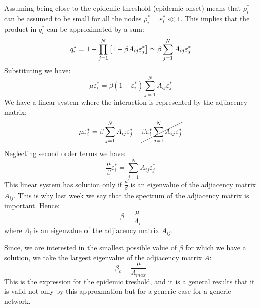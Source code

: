 \documentclass[../main/main.tex]{subfiles}
\begin{document}
Assuming being close to the epidemic threshold (epidemic onset) means that \( \rho _i^* \) can be assumed to be small for all the nodes \( \rho _i^* = \varepsilon _i^* \ll 1 \). This implies that the product in \( q_i^* \) can be approximated by a sum:
\begin{equation}
  q_i^* = 1 - \prod_{j=1}^{N} \qty[1- \beta A_{ij} \varepsilon _j^*] \simeq \beta \sum_{j=1}^{N} A_{ij} \varepsilon _j^*
\end{equation}
Substituting we have:
\begin{equation}
  \mu \varepsilon _i^* = \beta (1- \varepsilon _i^*) \sum_{j=1}^{N} A_{ij} \varepsilon _{j}^*
\end{equation}
We have a linear system where the interaction is represented by the adjiacency matrix:
\begin{equation*}
  \mu \varepsilon _i^* = \beta \sum_{j=1}^{N} A_{ij} \varepsilon _{j}^* - \cancel{ \beta \varepsilon _i^* \sum_{j=1}^{N} A_{ij} \varepsilon _{j}^* }
\end{equation*}
Neglecting second order terms we have:
\begin{equation}
  \frac{\mu }{\beta } \varepsilon _i^* = \sum_{j=1}^{N} A_{ij} \varepsilon _j^*
\end{equation}
This linear system has solution only if \( \frac{\mu }{\beta } \) is an eigenvalue of the adjiacency matrix \( A_{ij} \). This is why last week we say that the spectrum of the adjiacency matrix is important.
Hence:
\begin{equation}
  \beta = \frac{\mu }{\Lambda _i}
\end{equation}
where \( \Lambda _i \) is an eigenvalue of the adjiacency matrix \( A_{ij} \).

Since, we are interested in the smallest possible value of \( \beta  \) for which we have a solution, we take the largest eigenvalue of the adjiacency matrix \( A \):
\begin{equation}
  \beta _c = \frac{\mu }{\Lambda _{max}}
\end{equation}
This is the expression for the epidemic treshold, and it is a general results that it is valid not only by this approxmation but for a generic case for a generic network.
\end{document}
